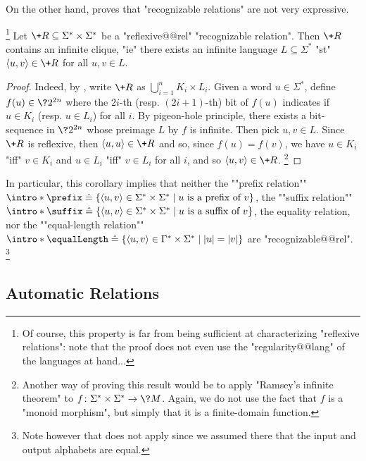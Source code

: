 On the other hand,  proves that "recognizable relations" are not very expressive.
\begin{corollary}
	\!\footnote{Of course, this property is far from being sufficient
	at characterizing "reflexive relations": note that the proof
	does not even use the "regularity@@lang" of the languages at hand...}%
	\AP\label{coro:infinite-clique-recognizable}
	Let $\+R \subseteq \Sigma^* \times \Sigma^*$ be a "reflexive@@rel" "recognizable relation".
	Then $\+R$ contains an infinite clique, "ie"
	there exists an infinite language $L \subseteq \Sigma^*$ "st"
	$\tup{u,v} \in \+R$ for all $u,v \in L$.
\end{corollary}
\begin{proof}
	Indeed, by , write $\+R$ as $\bigcup_{i=1}^n K_i \times L_i$.
	Given a word $u \in \Sigma^*$, define $f(u) \in \?2^{2n}$ where
	the $2i$-th (resp. $(2i+1)$-th) bit of $f(u)$ indicates if $u \in K_i$ (resp. $u \in L_i$)
	for all $i$.
	By pigeon-hole principle, there exists a bit-sequence in $\?2^{2n}$ whose preimage
	$L$ by $f$ is infinite. Then pick $u,v \in L$. Since $\+R$ is reflexive, then
	$\tup{u,u} \in \+R$ and so, since $f(u) = f(v)$, we
	have $u \in K_i$ "iff" $v \in K_i$ and
	$u \in L_i$ "iff" $v \in L_i$ for all $i$, and so $\tup{u,v} \in \+R$.%
	\footnote{Another way of proving this result would be
	to apply "Ramsey's infinite theorem" to $f\colon \Sigma^* \times \Sigma^* \to \?M$.
	Again, we do not use the fact that $f$ is a "monoid morphism", but simply
	that it is a finite-domain function.}
\end{proof}

In particular, this corollary implies that neither the \AP""prefix relation""
${\intro*\prefix} \defeq \{
	\tup{u,v} \in \Sigma^*\times\Sigma^* \mid
	\text{$u$ is a prefix of $v$}
\}$, the \AP""suffix relation""
${\intro*\suffix} \defeq \{
	\tup{u,v} \in \Sigma^*\times\Sigma^* \mid
	\text{$u$ is a suffix of $v$}
\}$, the equality relation, nor the ""equal-length relation""
${\intro*\equalLength} \defeq \{
	\tup{u,v} \in \Gamma^*\times\Sigma^* \mid
	|u| = |v|
\}$ are "recognizable@@rel".%
\footnote{Note however that  does not apply since
we assumed there that the input and output alphabets are equal.}

\subsection{Automatic Relations}

